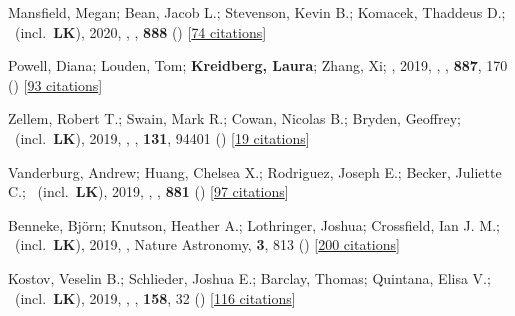 \item[{\color{numcolor}\scriptsize33}] Mansfield, Megan; Bean, Jacob L.; Stevenson, Kevin B.; Komacek, Thaddeus D.; \etal\ (incl.\ \textbf{LK}), 2020, , \apj, \textbf{888} () [\href{https://ui.adsabs.harvard.edu/abs/2020ApJ...888L..15M}{74 citations}]

\item[{\color{numcolor}\scriptsize32}] Powell, Diana; Louden, Tom; \textbf{Kreidberg, Laura}; Zhang, Xi; \etal, 2019, , \apj, \textbf{887}, 170 () [\href{https://ui.adsabs.harvard.edu/abs/2019ApJ...887..170P}{93 citations}]

\item[{\color{numcolor}\scriptsize31}] Zellem, Robert T.; Swain, Mark R.; Cowan, Nicolas B.; Bryden, Geoffrey; \etal\ (incl.\ \textbf{LK}), 2019, , \pasp, \textbf{131}, 94401 () [\href{https://ui.adsabs.harvard.edu/abs/2019PASP..131i4401Z}{19 citations}]

\item[{\color{numcolor}\scriptsize30}] Vanderburg, Andrew; Huang, Chelsea X.; Rodriguez, Joseph E.; Becker, Juliette C.; \etal\ (incl.\ \textbf{LK}), 2019, , \apj, \textbf{881} () [\href{https://ui.adsabs.harvard.edu/abs/2019ApJ...881L..19V}{97 citations}]

\item[{\color{numcolor}\scriptsize29}] Benneke, Bj{\"o}rn; Knutson, Heather A.; Lothringer, Joshua; Crossfield, Ian J. M.; \etal\ (incl.\ \textbf{LK}), 2019, , Nature Astronomy, \textbf{3}, 813 () [\href{https://ui.adsabs.harvard.edu/abs/2019NatAs...3..813B}{200 citations}]

\item[{\color{numcolor}\scriptsize28}] Kostov, Veselin B.; Schlieder, Joshua E.; Barclay, Thomas; Quintana, Elisa V.; \etal\ (incl.\ \textbf{LK}), 2019, , \aj, \textbf{158}, 32 () [\href{https://ui.adsabs.harvard.edu/abs/2019AJ....158...32K}{116 citations}]

